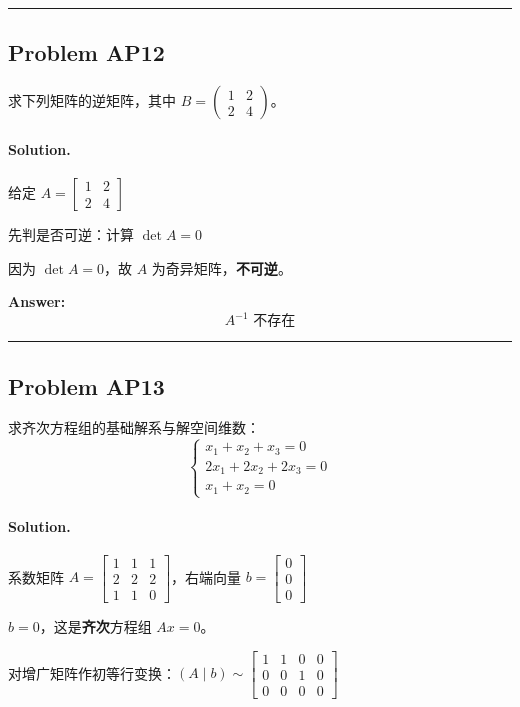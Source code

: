 \documentclass[12pt, a4paper]{article}
\newcommand{\problem}[1]{\subsection*{Problem #1}}
\newcommand{\solution}{\paragraph{Solution.}}
\begin{document}
\vspace{1em}
\hrule
\vspace{1em}

\problem{AP12}

求下列矩阵的逆矩阵，其中 $B = \begin{pmatrix} 1 & 2 \\ 2 & 4 \end{pmatrix}$。

\solution


给定 $A = \left[\begin{matrix}1 & 2\\2 & 4\end{matrix}\right]$

先判是否可逆：计算 $\det A = 0$

因为 $\det A = 0$，故 $A$ 为奇异矩阵，\textbf{不可逆}。

\textbf{Answer:}
\[A^{-1} \text{ 不存在}\]

\vspace{1em}
\hrule
\vspace{1em}

\problem{AP13}

求齐次方程组的基础解系与解空间维数：
   $$\begin{cases}
   x_1 + x_2 + x_3 = 0 \\
   2x_1 + 2x_2 + 2x_3 = 0 \\
   x_1 + x_2 = 0
   \end{cases}$$

\solution


系数矩阵 $A = \left[\begin{matrix}1 & 1 & 1\\2 & 2 & 2\\1 & 1 & 0\end{matrix}\right]$，右端向量 $b = \left[\begin{matrix}0\\0\\0\end{matrix}\right]$

$b = 0$，这是\textbf{齐次}方程组 $Ax = 0$。

对增广矩阵作初等行变换：$(A\mid b) \sim \left[\begin{matrix}1 & 1 & 0 & 0\\0 & 0 & 1 & 0\\0 & 0 & 0 & 0\end{matrix}\right]$
\end{document}
